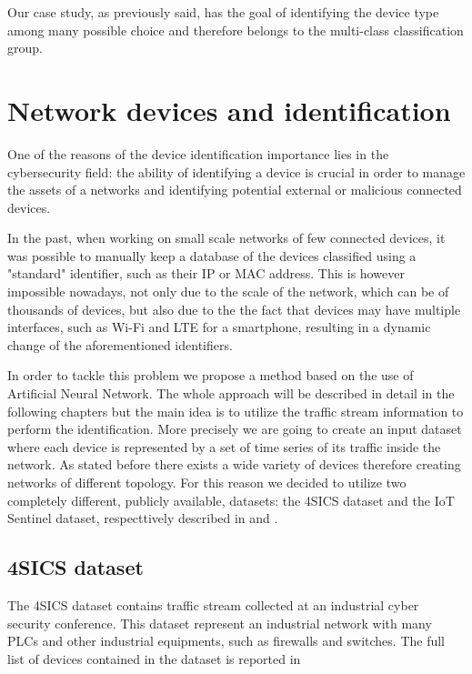 Our case study, as previously said, has the goal of identifying the device type among many possible choice and therefore belongs to the multi-class classification group.


\section{Network devices and identification}\label{identification}

One of the reasons of the device identification importance lies in the cybersecurity field: the ability of identifying a device is crucial in order to manage the assets of a networks and identifying potential external or malicious connected devices.

In the past, when working on small scale networks of few connected devices, it was possible to manually keep a database of the devices classified using a "standard" identifier, such as their IP or MAC address. This is however impossible nowadays, not only due to the scale of the network, which can be of thousands of devices, but also due to the the fact that devices may have multiple interfaces, such as Wi-Fi and LTE for a smartphone, resulting in a dynamic change of the aforementioned identifiers.

In order to tackle this problem we propose a method based on the use of Artificial Neural Network. The whole approach will be described in detail in the following chapters but the main idea is to utilize the traffic stream information to perform the identification. More precisely we are going to create an input dataset where each device is represented by a set of time series of its traffic inside the network. As stated before there exists a wide variety of devices therefore creating networks of different topology. For this reason we decided to utilize two completely different, publicly available, datasets: the 4SICS dataset and the IoT Sentinel dataset, respecttively described in  and .

\subsection{4SICS dataset}\label{4sics_sec}

The {4SICS dataset} contains traffic stream collected at an industrial cyber security conference. This dataset represent an industrial network with many PLCs and other industrial equipments, such as firewalls and switches. The full list of devices contained in the dataset is reported in 

